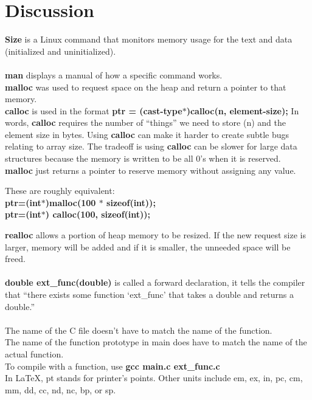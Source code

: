 \documentclass{article}
\begin{document}
\section{Discussion}
\textbf{Size} is a Linux command that monitors memory usage for the text and data (initialized and uninitialized).\\
\\ \textbf{man} displays a manual of how a specific command works.
\\ \textbf{malloc} was used to request space on the heap and return a pointer to that memory.
\\ \textbf{calloc} is used in the format \textbf{ptr = (cast-type$*$)calloc(n, element-size);}
In words, \textbf{calloc} requires the number of ``things'' we need to store (n) and the element size in bytes.
Using \textbf{calloc} can make it harder to create subtle bugs relating to array size.
The tradeoff is using \textbf{calloc} can be slower for large data structures because the memory is written to be all 0's when it is reserved.
\textbf{malloc} just returns a pointer to reserve memory without assigning any value.
\begin{center}
These are roughly equivalent:
\\ \textbf{ptr=(int$*$)malloc(100 $*$ sizeof(int));}
\\ \textbf{ptr=(int$*$) calloc(100, sizeof(int));}
\end{center}
\textbf{realloc} allows a portion of heap memory to be resized.
If the new request size is larger, memory will be added and if it is smaller, the unneeded space will be freed.\\
\\ \textbf{double ext\_func(double)} is called a forward declaration, it tells the compiler that ``there exists some function `ext\_func' that takes a double and returns a double.''\\
\\ The name of the C file doesn't have to match the name of the function.\\
The name of the function prototype in main does have to match the name of the actual function.\\
To compile with a function, use \textbf{gcc main.c ext\_func.c}\\
In LaTeX, pt stands for printer's points. Other units include em, ex, in, pc, cm, mm, dd, cc, nd, nc, bp, or sp.\\
\end{document}
